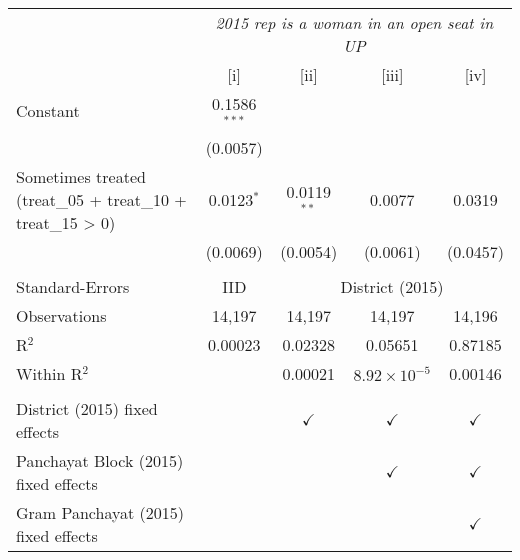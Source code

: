 
\begingroup
\centering
\begin{tabular}{lcccc}
   \toprule
    & \multicolumn{4}{c}{\textit{2015 rep is a woman in an open seat in UP}}\\
                                                                & [i]            & [ii]          & [iii]                 & [iv]\\  
   \midrule 
   Constant                                                     & 0.1586$^{***}$ &               &                       &   \\   
                                                                & (0.0057)       &               &                       &   \\   
   Sometimes treated (treat\_05 + treat\_10 + treat\_15 > 0)    & 0.0123$^{*}$   & 0.0119$^{**}$ & 0.0077                & 0.0319\\   
                                                                & (0.0069)       & (0.0054)      & (0.0061)              & (0.0457)\\   
    \\
   Standard-Errors & IID & \multicolumn{3}{c}{District (2015)} \\ 
   Observations                                                 & 14,197         & 14,197        & 14,197                & 14,196\\  
   R$^2$                                                        & 0.00023        & 0.02328       & 0.05651               & 0.87185\\  
   Within R$^2$                                                 &                & 0.00021       & $8.92\times 10^{-5}$  & 0.00146\\  
    \\
   District (2015) fixed effects                                &                & $\checkmark$  & $\checkmark$          & $\checkmark$\\   
   Panchayat Block (2015) fixed effects                         &                &               & $\checkmark$          & $\checkmark$\\   
   Gram Panchayat (2015) fixed effects                          &                &               &                       & $\checkmark$\\   
   \bottomrule
\end{tabular}
\par\endgroup


